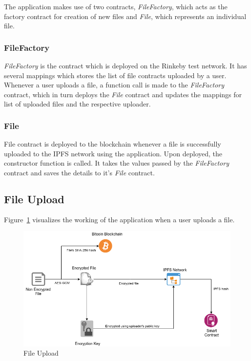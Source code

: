 The application makes use of two contracts, \textit{FileFactory}, which acts as the factory contract for creation of new files and \textit{File}, which represents an individual file.

\subsubsection{FileFactory}
\textit{FileFactory} is the contract which is deployed on the Rinkeby test network. It has several mappings which stores the list of file contracts uploaded by a user. Whenever a user uploads a file, a function call is made to the \textit{FileFactory} contract, which in turn deploys the \textit{File} contract and updates the mappings for list of uploaded files and the respective uploader.

\subsubsection{File}
File contract is deployed to the blockchain whenever a file is successfully uploaded to the IPFS network using the application. Upon deployed, the constructor function is called. It takes the values passed by the \textit{FileFactory} contract and saves the details to it’s \textit{File} contract.

\subsection{File Upload}
Figure~\ref{fig:ethereum-upload} visualizes the working of the application when a user uploads a file.

\begin{figure}[h]
	\includegraphics[width=\linewidth]{figures/ethereum-upload}
	\caption{\label{fig:ethereum-upload} File Upload}
\end{figure}

